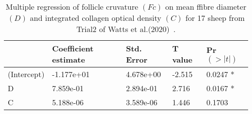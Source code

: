 %

\begin{table}[htp]
\centering
\caption{Multiple regression of follicle cruvature $(Fc)$ on mean ffibre diameter$(D)$ and integrated collagen optical density $(C)$ for 17 sheep from Trial2 of Watts et al.(2020)~\cite{watts-2020}.}
\label{tab:mreg}
\vspace{0.1in}
\begin{tabular}{|p{0.8in}|p{0.8in}|p{0.8in}|p{0.8in}|p{0.8in}|}  \hline
      & Coefficient estimate & Std. Error & T value & Pr$(>|t|)$ \\
\hline 
 (Intercept) & -1.177e+01 & 4.678e+00 & -2.515  & 0.0247 * \\
 D           & 7.859e-01  & 2.894e-01 &  2.716  & 0.0167 * \\
 C           & 5.188e-06  & 3.589e-06 &  1.446  &  0.1703   \\
\hline

\end{tabular}
\end{table}

%
